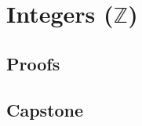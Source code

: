 \chapter{\texorpdfstring{Integers ($\mathbb{Z}$)}{Integers (Z)}}
\label{ch:integers}




\LRAExcludeFromPrintEditionBegin
\section*{Proofs}


\section*{Capstone}

\LRAExcludeFromPrintEditionEnd
